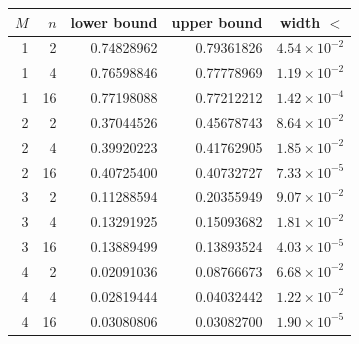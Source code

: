 \begin{tabular}{rrrrr}
\toprule
$M$ & $n$ & lower bound & upper bound & width $< $\\
\midrule
1 & 2 & 0.74828962 & 0.79361826 & $4.54\times10^{-2}$\\
1 & 4 & 0.76598846 & 0.77778969 & $1.19\times10^{-2}$\\
1 & 16 & 0.77198088 & 0.77212212 & $1.42\times10^{-4}$\\
2 & 2 & 0.37044526 & 0.45678743 & $8.64\times10^{-2}$\\
2 & 4 & 0.39920223 & 0.41762905 & $1.85\times10^{-2}$\\
2 & 16 & 0.40725400 & 0.40732727 & $7.33\times10^{-5}$\\
3 & 2 & 0.11288594 & 0.20355949 & $9.07\times10^{-2}$\\
3 & 4 & 0.13291925 & 0.15093682 & $1.81\times10^{-2}$\\
3 & 16 & 0.13889499 & 0.13893524 & $4.03\times10^{-5}$\\
4 & 2 & 0.02091036 & 0.08766673 & $6.68\times10^{-2}$\\
4 & 4 & 0.02819444 & 0.04032442 & $1.22\times10^{-2}$\\
4 & 16 & 0.03080806 & 0.03082700 & $1.90\times10^{-5}$\\
\bottomrule
\end{tabular}

